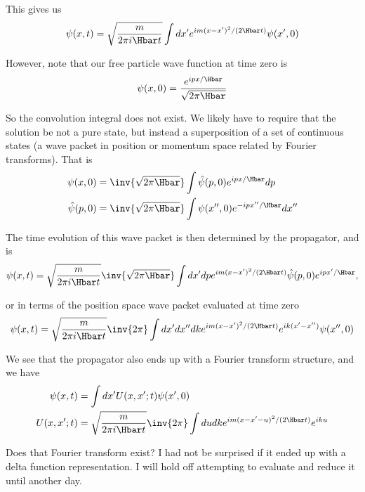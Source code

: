 {This gives us
\begin{equation}\label{eqn:qmIexamPractice2007Dec:1f:40}
\psi(x, t)
=
\sqrt{\frac{m}{2 \pi i \Hbar t}}
\int dx'
e^{i m (x-x')^2/ (2 \Hbar t)} \psi(x', 0)
\end{equation}

However, note that our free particle wave function at time zero is
%
\begin{equation}\label{eqn:qmIexamPractice2007Dec:1f:50}
\psi(x, 0) = \frac{e^{i p x/\Hbar}}{\sqrt{2 \pi \Hbar}}
\end{equation}

So the convolution integral  does not exist.  We likely have to require that the solution be not a pure state, but instead a superposition of a set of continuous states (a wave packet in position or momentum space related by Fourier transforms).  That is
%
\begin{equation}\label{eqn:qmIexamPractice2007Dec:1f:60}
\begin{aligned}
\psi(x, 0) &=
\inv{\sqrt{2 \pi \Hbar}} \int \hat{\psi}(p, 0) e^{i p x/\Hbar} dp \\
\hat{\psi}(p, 0) &=
\inv{\sqrt{2 \pi \Hbar}} \int \psi(x'', 0) e^{-i p x''/\Hbar} dx''
\end{aligned}
\end{equation}

The time evolution of this wave packet is then determined by the propagator, and is
%
\begin{equation}\label{eqn:qmIexamPractice2007Dec:1f:70}
\psi(x,t) =
\sqrt{\frac{m}{2 \pi i \Hbar t}}
\inv{\sqrt{2 \pi \Hbar}}
\int dx' dp
e^{i m (x-x')^2/ (2 \Hbar t)}
\hat{\psi}(p, 0) e^{i p x'/\Hbar} ,
\end{equation}

or in terms of the position space wave packet evaluated at time zero
%
\begin{equation}\label{eqn:qmIexamPractice2007Dec:1f:80}
\psi(x,t) =
\sqrt{\frac{m}{2 \pi i \Hbar t}}
\inv{2 \pi}
\int dx' dx'' dk
e^{i m (x-x')^2/ (2 \Hbar t)}
e^{i k (x' - x'')} \psi(x'', 0)
\end{equation}

We see that the propagator also ends up with a Fourier transform structure, and we have
%
\begin{equation}\label{eqn:qmIexamPractice2007Dec:1f:90}
\begin{aligned}
\psi(x,t) &= \int dx' U(x, x' ; t) \psi(x', 0) \\
U(x, x' ; t) &=
\sqrt{\frac{m}{2 \pi i \Hbar t}}
\inv{2 \pi}
\int du dk
e^{i m (x - x' - u)^2/ (2 \Hbar t)}
e^{i k u }
\end{aligned}
\end{equation}

Does that Fourier transform exist?  I had not be surprised if it ended up with a delta function representation.  I will hold off attempting to evaluate and reduce it until another day.

} %
